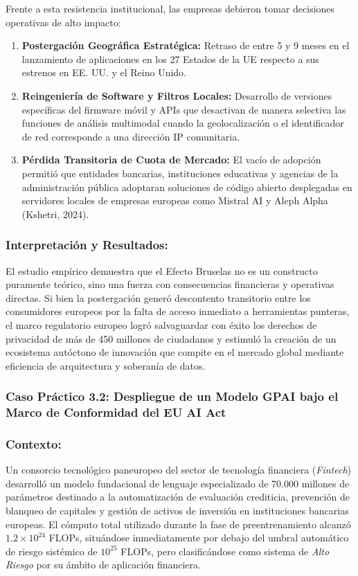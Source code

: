 Frente a esta resistencia institucional, las empresas debieron tomar decisiones operativas de alto impacto:
\begin{enumerate}[leftmargin=2em]
    \item \textbf{Postergación Geográfica Estratégica:} Retraso de entre 5 y 9 meses en el lanzamiento de aplicaciones en los 27 Estados de la UE respecto a sus estrenos en EE. UU. y el Reino Unido.
    \item \textbf{Reingeniería de Software y Filtros Locales:} Desarrollo de versiones específicas del firmware móvil y APIs que desactivan de manera selectiva las funciones de análisis multimodal cuando la geolocalización o el identificador de red corresponde a una dirección IP comunitaria.
    \item \textbf{Pérdida Transitoria de Cuota de Mercado:} El vacío de adopción permitió que entidades bancarias, instituciones educativas y agencias de la administración pública adoptaran soluciones de código abierto desplegadas en servidores locales de empresas europeas como Mistral AI y Aleph Alpha (Kshetri, 2024).
\end{enumerate}

\subsubsection*{Interpretación y Resultados:}
El estudio empírico demuestra que el Efecto Bruselas no es un constructo puramente teórico, sino una fuerza con consecuencias financieras y operativas directas. Si bien la postergación generó descontento transitorio entre los consumidores europeos por la falta de acceso inmediato a herramientas punteras, el marco regulatorio europeo logró salvaguardar con éxito los derechos de privacidad de más de 450 millones de ciudadanos y estimuló la creación de un ecosistema autóctono de innovación que compite en el mercado global mediante eficiencia de arquitectura y soberanía de datos.

\subsubsection{Caso Práctico 3.2: Despliegue de un Modelo GPAI bajo el Marco de Conformidad del EU AI Act}

\subsubsection*{Contexto:}
Un consorcio tecnológico paneuropeo del sector de tecnología financiera (\textit{Fintech}) desarrolló un modelo fundacional de lenguaje especializado de 70.000 millones de parámetros destinado a la automatización de evaluación crediticia, prevención de blanqueo de capitales y gestión de activos de inversión en instituciones bancarias europeas. El cómputo total utilizado durante la fase de preentrenamiento alcanzó $1.2 \times 10^{24}$ FLOPs, situándose inmediatamente por debajo del umbral automático de riesgo sistémico de $10^{25}$ FLOPs, pero clasificándose como sistema de \textit{Alto Riesgo} por su ámbito de aplicación financiera.

